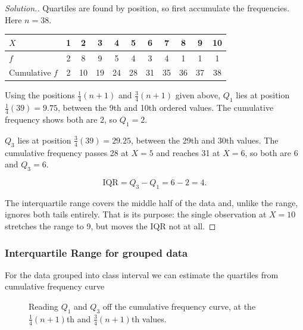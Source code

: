\documentclass[11pt,a4paper]{article}
\theoremstyle{definition}
\newenvironment{solution}
  {\renewcommand{\qedsymbol}{}\begin{proof}[\textit{Solution}.]}
  {\end{proof}}
\begin{document}
\begin{solution}
Quartiles are found by position, so first accumulate the frequencies. Here $n=38$.
\begin{table}[H]
\centering
\begin{tabular}{lcccccccccc}
$X$ & 1 & 2 & 3 & 4 & 5 & 6 & 7 & 8 & 9 & 10\\
\hline
$f$ & 2 & 8 & 9 & 5 & 4 & 3 & 4 & 1 & 1 & 1\\
Cumulative $f$ & 2 & 10 & 19 & 24 & 28 & 31 & 35 & 36 & 37 & 38\\
\end{tabular}
\end{table}

Using the positions $\tfrac14(n + 1)$ and $\tfrac34(n + 1)$ given above, $Q_1$ lies at
position $\tfrac{1}{4}(39)=9.75$, between the 9th and 10th ordered values. The cumulative
frequency shows both are $2$, so $Q_1=2$.

$Q_3$ lies at position $\tfrac{3}{4}(39)=29.25$, between the 29th and 30th values. The
cumulative frequency passes 28 at $X=5$ and reaches 31 at $X=6$, so both are $6$ and
$Q_3=6$.

\[\text{IQR}=Q_3-Q_1=6-2=4.\]

The interquartile range covers the middle half of the data and, unlike the range, ignores
both tails entirely. That is its purpose: the single observation at $X=10$ stretches the
range to 9, but moves the IQR not at all.
\end{solution}
\vspace{0.3cm}


\subsubsection{Interquartile Range for grouped data}
For the data grouped into class interval we can estimate the quartiles from cumulative frequency curve



\begin{figure}[H]
\centering
{}
\caption{Reading $Q_1$ and $Q_3$ off the cumulative frequency curve, at the $\tfrac{1}{4}(n+1)$th and $\tfrac{3}{4}(n+1)$th values.}
\end{figure}
\end{document}
